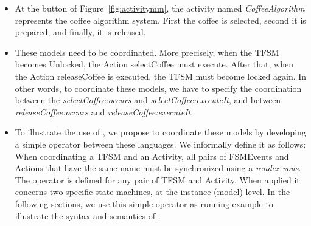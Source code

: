 \begin{itemize}
	\item At the button of Figure~\ref{fig:activitymm}, the activity named \emph{CoffeeAlgorithm} represents the coffee algorithm system. First the coffee is selected, second it is prepared, and finally, it is released.    
	
	\item These models need to be coordinated. More precisely, when the TFSM becomes Unlocked, the Action selectCoffee must execute. After that, when the Action releaseCoffee is executed, the TFSM must become locked again. In other words, to coordinate these models, we have to specify the coordination between the \mse \emph{selectCoffee:occurs} and \emph{selectCoffee:executeIt}, and  between \emph{releaseCoffee:occurs} and \emph{releaseCoffee:executeIt}.
	
	\item To illustrate the use of \bcool, we propose to coordinate these models by developing a simple \bcool operator between these languages. We informally define it as follows: When coordinating a TFSM and an Activity, all pairs of FSMEvents and Actions that have the same name must be synchronized using a \emph{rendez-vous}. The operator is defined for any pair of TFSM and Activity. When applied it concerns two specific state machines, at the instance (model) level.  In the following sections, we use this simple operator as running example to illustrate the syntax and semantics of \bcool.  	
\end{itemize}






